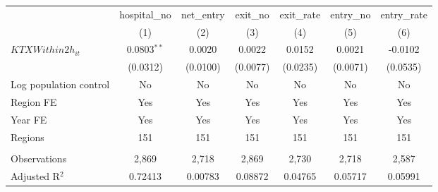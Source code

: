 \begingroup
\centering
\begin{tabular}{lcccccc}
   \toprule
                          & hospital\_no  & net\_entry  & exit\_no  & exit\_rate  & entry\_no  & entry\_rate \\    
                          & (1)           & (2)         & (3)       & (4)         & (5)        & (6)\\  
   \midrule 
   $KTXWithin2h_{it}$     & 0.0803$^{**}$ & 0.0020      & 0.0022    & 0.0152      & 0.0021     & -0.0102\\   
                          & (0.0312)      & (0.0100)    & (0.0077)  & (0.0235)    & (0.0071)   & (0.0535)\\   
   Log population control & No            & No          & No        & No          & No         & No\\  
   Region FE              & Yes           & Yes         & Yes       & Yes         & Yes        & Yes\\  
   Year FE                & Yes           & Yes         & Yes       & Yes         & Yes        & Yes\\  
   Regions                & 151           & 151         & 151       & 151         & 151        & 151\\  
    \\
   Observations           & 2,869         & 2,718       & 2,869     & 2,730       & 2,718      & 2,587\\  
   Adjusted R$^2$         & 0.72413       & 0.00783     & 0.08872   & 0.04765     & 0.05717    & 0.05991\\  
   \bottomrule
\end{tabular}
\par\endgroup

